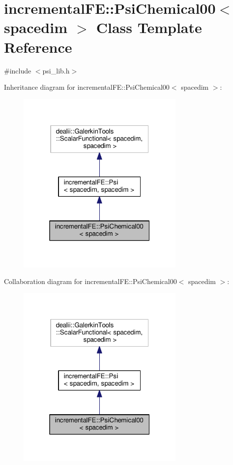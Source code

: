 \hypertarget{classincremental_f_e_1_1_psi_chemical00}{}\section{incremental\+FE\+:\+:Psi\+Chemical00$<$ spacedim $>$ Class Template Reference}
\label{classincremental_f_e_1_1_psi_chemical00}


{\ttfamily \#include $<$psi\+\_\+lib.\+h$>$}



Inheritance diagram for incremental\+FE\+:\+:Psi\+Chemical00$<$ spacedim $>$\+:\nopagebreak
\begin{figure}[H]
\begin{center}
\leavevmode
\includegraphics[width=232pt]{classincremental_f_e_1_1_psi_chemical00__inherit__graph}
\end{center}
\end{figure}


Collaboration diagram for incremental\+FE\+:\+:Psi\+Chemical00$<$ spacedim $>$\+:\nopagebreak
\begin{figure}[H]
\begin{center}
\leavevmode
\includegraphics[width=232pt]{classincremental_f_e_1_1_psi_chemical00__coll__graph}
\end{center}
\end{figure}
